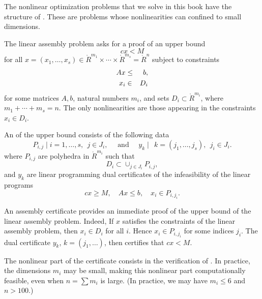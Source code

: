 The nonlinear optimization problems that we solve in this book have
the structure of .  These are
problems whose nonlinearities can confined to small dimensions.

The linear assembly problem asks for a proof of an upper bound
\begin{equation}\label{eqn:cxM}
c x < M
\end{equation}
for all $x=(x_1,\ldots,x_s)\in \ring{R}^{m_1}\times\cdots
\times\ring{R}^{m_s}=\ring{R}^n$
subject to constraints
\begin{eqnarray}
A x &\le& b,\notag\\
x_i &\in& D_i\notag
\end{eqnarray}
for some matrices $A,b$, natural numbers $m_i$, and sets $D_i\subset
\ring{R}^{m_i}$, where $m_1+\cdots+m_s = n$.  The only nonlinearities
are those appearing in the constraints $x_i\in D_i$.

An  of the upper bound 
consists of the following data
\[
P_{i,j}\mid i=1,\ldots,s,~~j\in J_i,\quad\text{ and }\quad 
y_k\mid~~k=(j_1,\ldots,j_s),~~j_i\in J_i.
\]
where $P_{i,j}$ are polyhedra in $\ring{R}^{m_i}$ such that 
\begin{equation}\label{eqn:DP}
D_i \subset\cup_{j\in J_i} P_{i,j},
\end{equation} and $y_k$ are linear programming
dual certificates of the infeasibility of the linear programs
\[
c x \ge M,\quad A x \le b,\quad x_i\in P_{i,j_i}.
\]

An assembly certificate provides an immediate proof of the upper bound
of the linear assembly problem.  Indeed, If $x$ satisfies the
constraints of the linear assembly problem, then $x_i\in D_i$ for all
$i$.  Hence $x_i\in P_{i,j_i}$ for some indices $j_i$.  The dual
certificate $y_k$, $k=(j_1,\ldots)$, then certifies that $c x < M$.

The nonlinear part of the certificate consists in the verification
of .  In practice, the dimensions $m_i$
may be small, making this nonlinear part computationally feasible,
even when $n=\sum m_i$ is large.  (In practice, we may have $m_i\le 6$
and $n > 100$.)

